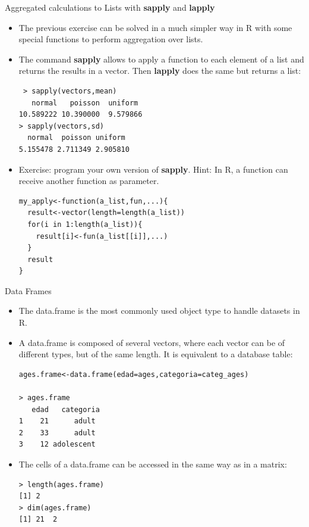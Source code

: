 \documentclass[handout]{beamer}
\begin{document}
\begin{frame}[fragile]{Aggregated calculations to Lists with \textbf{sapply} and \textbf{lapply}}
 \scriptsize{
 \begin{itemize}
  \item The previous exercise can be solved in a much simpler way in R with some special functions to perform aggregation over lists.
  \item The command \textbf{sapply} allows to apply a function to each element of a list and returns the results in a vector. Then \textbf{lapply} does the same but returns a list:
 \begin{verbatim}
 > sapply(vectors,mean)
   normal   poisson  uniform 
10.589222 10.390000  9.579866 
> sapply(vectors,sd)
  normal  poisson uniform 
5.155478 2.711349 2.905810  
 \end{verbatim}  

 \item Exercise: program your own version of \textbf{sapply}. Hint: In R, a function can receive another function as parameter. 
\begin{verbatim}
my_apply<-function(a_list,fun,...){
  result<-vector(length=length(a_list))
  for(i in 1:length(a_list)){
    result[i]<-fun(a_list[[i]],...)
  }
  result 
}
\end{verbatim}
  
 \end{itemize}
 
 }
\end{frame}


\begin{frame}[fragile]{Data Frames}
\scriptsize{
\begin{itemize}
 \item The data.frame is the most commonly used object type to handle datasets in R.
 
 \item A data.frame is composed of several vectors, where each vector can be of different types, but of the same length. It is equivalent to a database table:
 \begin{verbatim}
ages.frame<-data.frame(edad=ages,categoria=categ_ages)

> ages.frame
   edad   categoria
1    21      adult
2    33      adult
3    12 adolescent
\end{verbatim}

\item The cells of a data.frame can be accessed in the same way as in a matrix:
\begin{verbatim}
> length(ages.frame)
[1] 2
> dim(ages.frame)
[1] 21  2 
\end{verbatim}
 
\end{itemize}



}
\end{frame}
\end{document}
